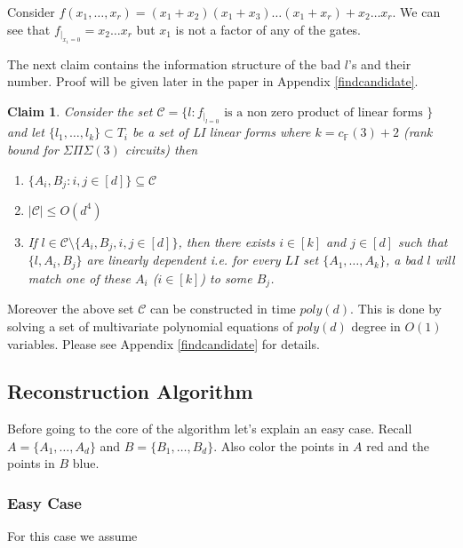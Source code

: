 \documentclass[letterpaper,USenglish,numberwithinsect]{lipics}
\newcommand{\F}{\mathbb{F}}
\newcommand{\MC}{\mathcal{C}}
\newtheorem{claim}[theorem]{Claim}
\begin{document}
\begin{example}
 Consider $f(x_1,\ldots,x_r) = (x_1+x_2)(x_1+x_3)\ldots (x_1+x_{r}) + x_2\ldots x_r$. We can see that $f_{|_{x_1=0}} = x_2\ldots x_r$ but
 $x_1$ is not a factor of any of the gates.
\end{example}

The next claim contains the information structure of the bad $l$'s and their number. Proof will be given
later in the paper in Appendix \ref{findcandidate}.

\begin{claim}\label{structclaim}
 Consider the set $\MC = \{ l : f_{|_{l=0}} \text{ is a non zero product of linear forms }\}$ and let $\{l_1,\ldots,l_{k}\}\subset T_i$
 be a set of LI linear forms where $k=c_\F(3)+2$ (rank bound for $\Sigma\Pi\Sigma(3)$ circuits) then
 \begin{enumerate}
 \item $\{A_i,B_j : i,j\in [d]\}\subseteq \MC$
  \item $|\MC| \leq O(d^4)$
  \item \label{struct}If $l\in \MC \setminus \{A_i,B_j, i,j\in [d]\}$, then there exists $i\in [k]$ and $j\in [d]$ such that $\{l,A_i,B_j\}$
  are linearly dependent i.e. for every $LI$ set $\{A_1,\ldots, A_k\}$, a bad $l$ will match one of these $A_i$ ($i\in [k]$) to some $B_j$.
 \end{enumerate}
\end{claim}

Moreover the above set $\MC$ can be constructed in time $poly(d)$. This is done by solving a set of multivariate polynomial equations of
$poly(d)$ degree in $O(1)$ variables. Please see Appendix \ref{findcandidate} for details.

\subsection{Reconstruction Algorithm}
Before going to the core of the algorithm let's explain an easy case. Recall $A = \{A_1,\ldots,A_d\}$ and $B = \{B_1,\ldots,B_d\}$. Also color the points in $A$ red and the points in $B$ blue.
\subsubsection{Easy Case}
 For this case we assume

\begin{center}
\end{center}
\end{document}
